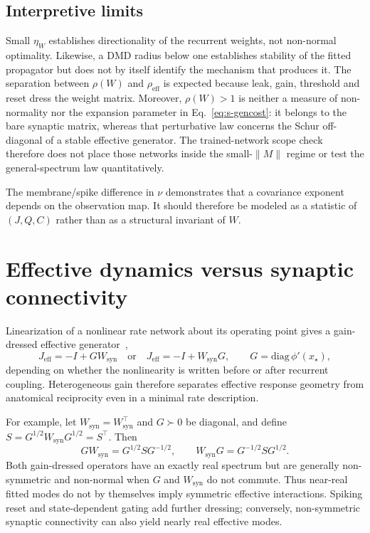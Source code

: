 \documentclass[
  aps,prl,preprint,notitlepage,superscriptaddress,nofootinbib,longbibliography,
  amsmath,amssymb
]{revtex4-2}
\begin{document}
\subsection{Interpretive limits}

Small $\eta_W$ establishes directionality of the recurrent weights, not
non-normal optimality. Likewise, a DMD radius below one establishes stability of
the fitted propagator but does not by itself identify the mechanism that
produces it. The separation between $\rho(W)$ and $\rho_{\mathrm{eff}}$ is
expected because leak, gain, threshold and reset dress the weight matrix.
Moreover, $\rho(W)>1$ is neither a measure of non-normality nor the expansion
parameter in Eq.~\eqref{eq:s-gencost}: it belongs to the bare synaptic matrix,
whereas that perturbative law concerns the Schur off-diagonal of a stable
effective generator.  The trained-network scope check therefore does not place
those networks inside the small-$\|M\|$ regime or test the general-spectrum law
quantitatively.

The membrane/spike difference in $\nu$ demonstrates that a covariance exponent
depends on the observation map. It should therefore be modeled as a statistic
of $(J,Q,C)$ rather than as a structural invariant of $W$.

\section{Effective dynamics versus synaptic connectivity}
\label{sec:s-effective}

Linearization of a nonlinear rate network about its operating point gives a
gain-dressed effective generator~\cite{chau2025},
\begin{equation}
J_{\mathrm{eff}}=-I+GW_{\mathrm{syn}}
\quad\text{or}\quad
J_{\mathrm{eff}}=-I+W_{\mathrm{syn}}G,
\qquad G=\mathrm{diag}\,\phi'(x_\star),
\end{equation}
depending on whether the nonlinearity is written before or after recurrent
coupling.  Heterogeneous gain therefore separates effective response geometry
from anatomical reciprocity even in a minimal rate description.

For example, let $W_{\mathrm{syn}}=W_{\mathrm{syn}}^\top$ and $G\succ0$ be
diagonal, and define $S=G^{1/2}W_{\mathrm{syn}}G^{1/2}=S^\top$.  Then
\begin{equation}
GW_{\mathrm{syn}}=G^{1/2}SG^{-1/2},\qquad
W_{\mathrm{syn}}G=G^{-1/2}SG^{1/2}.
\label{eq:s-gain-similarity}
\end{equation}
Both gain-dressed operators have an exactly real spectrum but are generally
non-symmetric and non-normal when $G$ and $W_{\mathrm{syn}}$ do not commute.
Thus near-real fitted modes do not by themselves imply symmetric effective
interactions.  Spiking reset and state-dependent gating add further dressing;
conversely, non-symmetric synaptic connectivity can also yield nearly real
effective modes.
\end{document}
